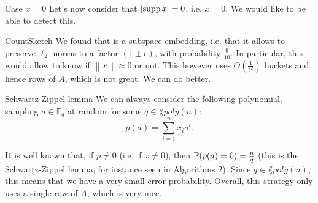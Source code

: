 \documentclass[a4paper]{article}
\begin{document}
\begin{parag}{Case $x = 0$}
    Let's now consider that $\left|\supp x\right| = 0$, i.e. $x = 0$. We would like to be able to detect this.

    \begin{subparag}{CountSketch}
        We found that  is a subspace embedding, i.e. that it allows to preserve $\ell_2$ norms to a factor $\left(1 \pm \epsilon\right)$, with probability $\frac{9}{10}$. In particular, this would allow to know if $\left\|x\right\| \approx 0$ or not. This however uses $O\left(\frac{1}{\epsilon^2}\right)$ buckets and hence rows of $A$, which is not great. We can do better.
    \end{subparag}

    \begin{subparag}{Schwartz-Zippel lemma}
        We can always consider the following polynomial, sampling $a \in \mathbb{F}_q$ at random for some $q \in \lang{poly}\left(n\right)$: 
        \[p\left(a\right) = \sum_{i=1}^{n} x_i a^i.\]
        
        It is well known that, if $p \neq 0$ (i.e. if $x \neq 0$), then $\prob\left(p\left(a\right) = 0\right) = \frac{n}{q}$ (this is the Schwartz-Zippel lemma, for instance seen in Algorithms 2). Since $q \in \lang{poly}\left(n\right)$, this means that we have a very small error probability. Overall, this strategy only uses a single row of $A$, which is very nice.
    \end{subparag}
\end{parag}
\end{document}
